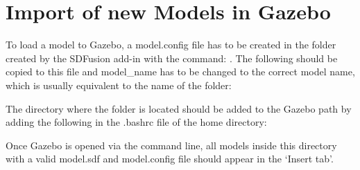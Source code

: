 \section{Import of new Models in Gazebo}
\label{sec:Gaz}
To load a model to Gazebo, a model.config file has to be created in the folder created by the SDFusion add-in with the command: . The following should be copied to this file and model\_name has to be changed to the correct model name, which is usually equivalent to the name of the folder:

The directory where the folder is located should be added to the Gazebo path by adding the following in the .bashrc file of the home directory:

Once Gazebo is opened via the command line, all models inside this directory with a valid model.sdf and model.config file should appear in the ‘Insert tab’.

